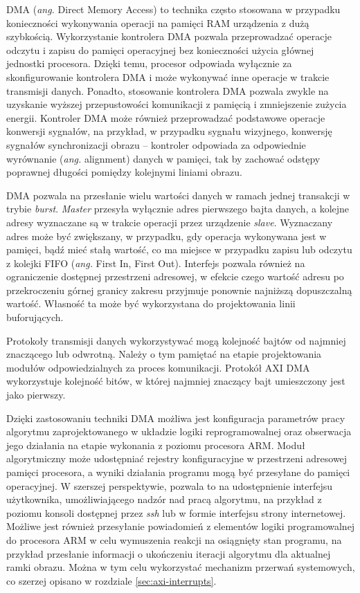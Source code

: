 DMA (\emph{ang.} Direct Memory Access) to technika często stosowana w przypadku konieczności wykonywania operacji na pamięci RAM urządzenia z dużą szybkością. %
Wykorzystanie kontrolera DMA pozwala przeprowadzać operacje odczytu i zapisu do pamięci operacyjnej bez konieczności użycia głównej jednostki procesora. 
Dzięki temu, procesor odpowiada wyłącznie za skonfigurowanie kontrolera DMA i może wykonywać inne operacje w trakcie transmisji danych. 
Ponadto, stosowanie kontrolera DMA pozwala zwykle na uzyskanie wyższej przepustowości komunikacji z pamięcią i zmniejszenie zużycia energii.
Kontroler DMA może również przeprowadzać podstawowe operacje konwersji sygnałów, na przykład, w przypadku sygnału wizyjnego, konwersję sygnałów synchronizacji obrazu -- kontroler odpowiada za odpowiednie wyrównanie (\emph{ang.} alignment) danych w pamięci, tak by zachować odstępy poprawnej długości pomiędzy kolejnymi liniami obrazu. %

DMA pozwala na przesłanie wielu wartości danych w ramach jednej transakcji w trybie \emph{burst}. 
\emph{Master} przesyła wyłącznie adres pierwszego bajta danych, a kolejne adresy wyznaczane są w trakcie operacji przez urządzenie \emph{slave}.
Wyznaczany adres może być zwiększany, w przypadku, gdy operacja wykonywana jest w pamięci, bądź mieć stałą wartość, co ma miejsce w przypadku zapisu lub odczytu z kolejki FIFO (\emph{ang.} First In, First Out). 
Interfejs pozwala również na ograniczenie dostępnej przestrzeni adresowej, w efekcie czego wartość adresu po przekroczeniu górnej granicy zakresu przyjmuje ponownie najniższą dopuszczalną wartość. 
Własność ta może być wykorzystana do projektowania linii buforujących.

Protokoły transmisji danych wykorzystywać mogą kolejność bajtów od najmniej znaczącego lub odwrotną. Należy o tym pamiętać na etapie projektowania modułów odpowiedzialnych za proces komunikacji. Protokół AXI DMA wykorzystuje kolejność bitów, w której najmniej znaczący bajt umieszczony jest jako pierwszy. %

Dzięki zastosowaniu techniki DMA możliwa jest konfiguracja parametrów pracy algorytmu zaprojektowanego w układzie logiki reprogramowalnej oraz obserwacja jego działania na etapie wykonania z poziomu procesora ARM. Moduł algorytmiczny może udostępniać rejestry konfiguracyjne w przestrzeni adresowej pamięci procesora, a wyniki działania programu mogą być przesyłane do pamięci operacyjnej.%
W szerszej perspektywie, pozwala to na udostępnienie interfejsu użytkownika, umożliwiającego nadzór nad pracą algorytmu, na przykład z poziomu konsoli dostępnej przez \emph{ssh} lub w formie interfejsu strony internetowej. 
Możliwe jest również przesyłanie powiadomień z elementów logiki programowalnej do procesora ARM w celu wymuszenia reakcji na osiągnięty stan programu, na przykład przesłanie informacji o ukończeniu iteracji algorytmu dla aktualnej ramki obrazu. %
Można w tym celu wykorzystać mechanizm przerwań systemowych, co szerzej opisano w rozdziale \ref{sec:axi-interrupts}.

